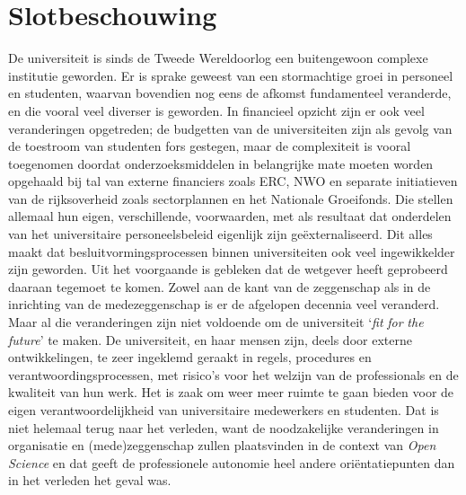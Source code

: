 \documentclass[smallauthor, chapterhaspagenum, nochapterinheader, pagenuminheader,  bigchapnum,medium2, tocpages, garamond, titleinheader]{jote-book}
\begin{document}
	\section{Slotbeschouwing}



	De universiteit is sinds de Tweede Wereldoorlog een buitengewoon complexe institutie geworden. Er is sprake geweest van een stormachtige groei in personeel en studenten, waarvan bovendien nog eens de afkomst fundamenteel veranderde, en die vooral veel diverser is geworden. In financieel opzicht zijn er ook veel veranderingen opgetreden; de budgetten van de universiteiten zijn als gevolg van de toestroom van studenten fors gestegen, maar de complexiteit is vooral toegenomen doordat onderzoeksmiddelen in belangrijke mate moeten worden opgehaald bij tal van externe financiers zoals ERC, NWO en separate initiatieven van de rijksoverheid zoals sectorplannen en het Nationale Groeifonds. Die stellen allemaal hun eigen, verschillende, voorwaarden, met als resultaat dat onderdelen van het universitaire personeelsbeleid eigenlijk zijn geëxternaliseerd. Dit alles maakt dat besluitvormingsprocessen binnen universiteiten ook veel ingewikkelder zijn geworden. Uit het voorgaande is gebleken dat de wetgever heeft geprobeerd daaraan tegemoet te komen. Zowel aan de kant van de zeggenschap als in de inrichting van de medezeggenschap is er de afgelopen decennia veel veranderd. Maar al die veranderingen zijn niet voldoende om de universiteit ‘\emph{fit }\emph{for}\emph{ }\emph{the}\emph{ }\emph{future}' te maken. De universiteit, en haar mensen zijn, deels door externe ontwikkelingen, te zeer ingeklemd geraakt in regels, procedures en verantwoordingsprocessen, met risico's voor het welzijn van de professionals en de kwaliteit van hun werk. Het is zaak om weer meer ruimte te gaan bieden voor de eigen verantwoordelijkheid van universitaire medewerkers en studenten. Dat is niet helemaal terug naar het verleden, want de noodzakelijke veranderingen in organisatie en (mede)zeggenschap zullen plaatsvinden in de context van \emph{Open }\emph{Science} en dat geeft de professionele autonomie heel andere oriëntatiepunten dan in het verleden het geval was.





\end{document}
